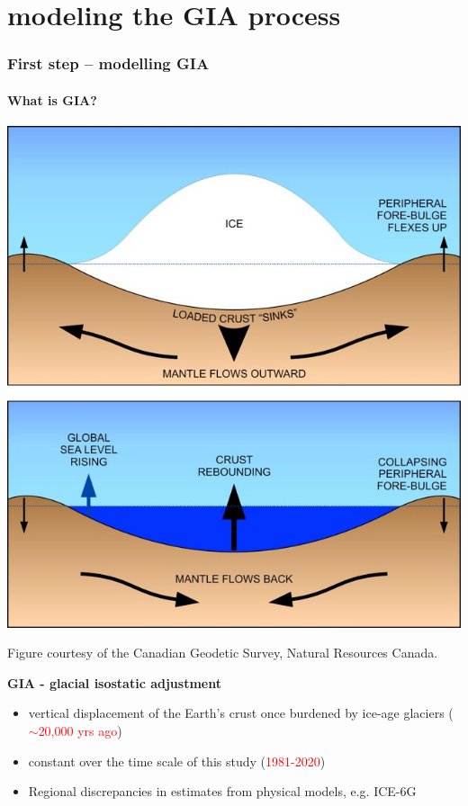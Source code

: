 \documentclass{beamer}
\begin{document}
\section{modeling the GIA process}
\begin{frame}
\frametitle{First step -- modelling GIA}
\framesubtitle{What is GIA?}


\begin{minipage}[c]{0.4\textwidth}
\includegraphics[width = \textwidth]{images/gia}

\tiny{Figure courtesy of the Canadian Geodetic Survey, Natural Resources Canada.}
\end{minipage}%
\hfill
\begin{minipage}[c]{0.55\textwidth}
\textbf{GIA - glacial isostatic adjustment}
\begin{itemize}
\item  vertical displacement of the Earth's crust once burdened by ice-age glaciers (\textcolor{red}{$\sim$20,000 yrs ago})
\item  constant over the time scale of this study (\textcolor{red}{1981-2020})
\item Regional discrepancies in estimates from physical models, e.g. ICE-6G \citep{Peltier}
\end{itemize}
\end{minipage}


\end{frame}
\end{document}
